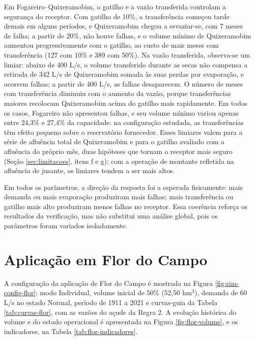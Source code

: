 Em Fogareiro--Quixeramobim, o gatilho e a vazão transferida controlam a segurança do receptor. Com gatilho de 10\%, a transferência começou tarde demais em alguns períodos, e Quixeramobim chegou a esvaziar-se, com 7 meses de falha; a partir de 20\%, não houve falhas, e o volume mínimo de Quixeramobim aumentou progressivamente com o gatilho, ao custo de mais meses com transferência (127 com 10\% e 389 com 50\%). Na vazão transferida, observa-se um limiar: abaixo de 400 L/s, o volume transferido durante as secas não compensa a retirada de 342 L/s de Quixeramobim somada às suas perdas por evaporação, e ocorrem falhas; a partir de 400 L/s, as falhas desaparecem. O número de meses com transferência diminuiu com o aumento da vazão, porque transferências maiores recolocam Quixeramobim acima do gatilho mais rapidamente. Em todos os casos, Fogareiro não apresentou falhas, e seu volume mínimo variou apenas entre 24,3\% e 27,4\% da capacidade: na configuração estudada, as transferências têm efeito pequeno sobre o reservatório fornecedor. Esses limiares valem para a série de afluência total de Quixeramobim e para o gatilho avaliado com a afluência do próprio mês, duas hipóteses que tornam o receptor mais seguro (Seção \ref{sec:limitacoes}, itens f e g); com a operação de montante refletida na afluência de jusante, os limiares tendem a ser mais altos.

Em todos os parâmetros, a direção da resposta foi a esperada fisicamente: mais demanda ou mais evaporação produziram mais falhas; mais transferência ou gatilho mais alto produziram menos falhas no receptor. Essa coerência reforça os resultados da verificação, mas não substitui uma análise global, pois os parâmetros foram variados isoladamente.

\section{Aplicação em Flor do Campo}
\label{sec:aplicacao-flor}

A configuração da aplicação de Flor do Campo é mostrada na Figura \ref{fig:sim-config-flor}: modo Individual, volume inicial de 50\% (52,50 hm$^3$), demanda de 60 L/s no estado Normal, período de 1911 a 2021 e curvas-guia da Tabela \ref{tab:curvas-flor}, com as vazões do açude da Regra 2. A evolução histórica do volume e do estado operacional é apresentada na Figura \ref{fig:flor-volume}, e os indicadores, na Tabela \ref{tab:flor-indicadores}.

